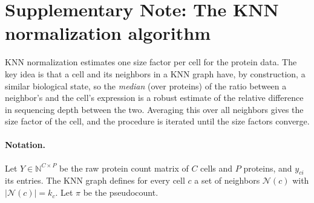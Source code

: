 \documentclass[11pt]{article}
\newcommand{\N}{\mathcal{N}}
\begin{document}
\section*{Supplementary Note: The KNN normalization algorithm}

KNN normalization estimates one size factor per cell for the protein data. The
key idea is that a cell and its neighbors in a KNN graph have, by construction,
a similar biological state, so the \emph{median} (over proteins) of the ratio
between a neighbor's and the cell's expression is a robust estimate of the
relative difference in sequencing depth between the two. Averaging this over
all neighbors gives the size factor of the cell, and the procedure is iterated
until the size factors converge.

\paragraph{Notation.}
Let $Y \in \mathbb{N}^{C \times P}$ be the raw protein count matrix of $C$ cells
and $P$ proteins, and $y_{ci}$ its entries. The KNN graph defines for every cell
$c$ a set of neighbors $\N(c)$ with $|\N(c)| = k_c$. Let $\pi$ be the
pseudocount.
\end{document}
